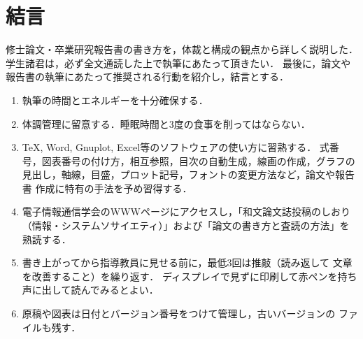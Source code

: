 \documentclass[main]{subfiles}
\begin{document}
\chapter{結言}
修士論文・卒業研究報告書の書き方を，体裁と構成の観点から詳しく説明した．
学生諸君は，必ず全文通読した上で執筆にあたって頂きたい． 
最後に，論文や報告書の執筆にあたって推奨される行動を紹介し，結言とする．

\begin{enumerate}
\item 執筆の時間とエネルギーを十分確保する．
\item 体調管理に留意する．睡眠時間と3度の食事を削ってはならない．
\item \TeX, Word, Gnuplot, Excel等のソフトウェアの使い方に習熟する．
式番号，図表番号の付け方，相互参照，目次の自動生成，線画の作成，グラフの
見出し，軸線，目盛，プロット記号，フォントの変更方法など，論文や報告書
作成に特有の手法を予め習得する．
\item 電子情報通信学会のWWWページにアクセスし，「和文論文誌投稿のしおり
（情報・システムソサイエティ）」および「論文の書き方と査読の方法」を熟読する．
\item 書き上がってから指導教員に見せる前に，最低3回は推敲（読み返して
文章を改善すること）を繰り返す．
ディスプレイで見ずに印刷して赤ペンを持ち声に出して読んでみるとよい．
\item 原稿や図表は日付とバージョン番号をつけて管理し，古いバージョンの
ファイルも残す．
\end{enumerate}
\end{document}
